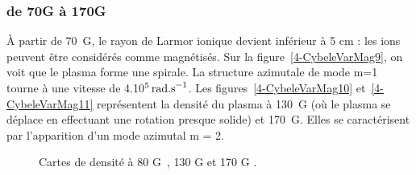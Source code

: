 \begin{refsection}
\subsubsection{de 70G à 170G}
À partir de 70~G, le rayon de Larmor ionique devient inférieur à 5 cm : les ions
peuvent être considérés comme magnétisés.
Sur la figure~\ref{4-CybeleVarMag9}, on voit que le
plasma forme une spirale. La structure azimutale de mode m=1 tourne à une
vitesse de 4.10$^{{5}}\,\text{rad.s}^{{-1}}$. Les
figures~\ref{4-CybeleVarMag10} et~\ref{4-CybeleVarMag11} représentent la densité
du plasma à 130~G (où le plasma se déplace en effectuant une rotation presque
solide) et 170~G. Elles se caractérisent par l'apparition d'un mode azimutal
m = 2.
\begin{figure}[!htbp]
  \centering
    \caption{Cartes de densité à 80 G~, 130 G
     et 170 G .}
    \label{4-CybeleVarMag-3}
\end{figure}


\end{refsection}
